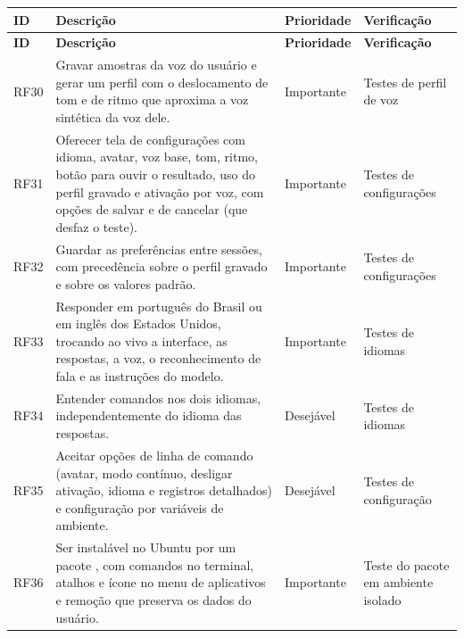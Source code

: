 \begin{singlespace}
\label{qua:rf-config}
\small
\begin{tabularx}{\textwidth}{|C{1.25cm}|L|C{2.0cm}|P{3.2cm}|}
\hline
\textbf{ID} & \textbf{Descrição} & \textbf{Prioridade} & \textbf{Verificação} \\ \hline
\endfirsthead
\hline
\textbf{ID} & \textbf{Descrição} & \textbf{Prioridade} & \textbf{Verificação} \\ \hline
\endhead
RF30 & Gravar amostras da voz do usuário e gerar um perfil com o deslocamento de tom e de ritmo que
       aproxima a voz sintética da voz dele. & Importante & Testes de perfil de voz \\ \hline
RF31 & Oferecer tela de configurações com idioma, avatar, voz base, tom, ritmo, botão para ouvir o
       resultado, uso do perfil gravado e ativação por voz, com opções de salvar e de cancelar (que
       desfaz o teste). & Importante & Testes de configurações \\ \hline
RF32 & Guardar as preferências entre sessões, com precedência sobre o perfil gravado e sobre os valores
       padrão. & Importante & Testes de configurações \\ \hline
RF33 & Responder em português do Brasil ou em inglês dos Estados Unidos, trocando ao vivo a interface,
       as respostas, a voz, o reconhecimento de fala e as instruções do modelo. & Importante & Testes de idiomas \\ \hline
RF34 & Entender comandos nos dois idiomas, independentemente do idioma das respostas. & Desejável & Testes de idiomas \\ \hline
RF35 & Aceitar opções de linha de comando (avatar, modo contínuo, desligar ativação, idioma e registros
       detalhados) e configuração por variáveis de ambiente. & Desejável & Testes de configuração \\ \hline
RF36 & Ser instalável no Ubuntu por um pacote , com comandos no terminal, atalhos e ícone no
       menu de aplicativos e remoção que preserva os dados do usuário. & Importante & Teste do pacote em ambiente isolado \\ \hline
\end{tabularx}
\end{singlespace}

